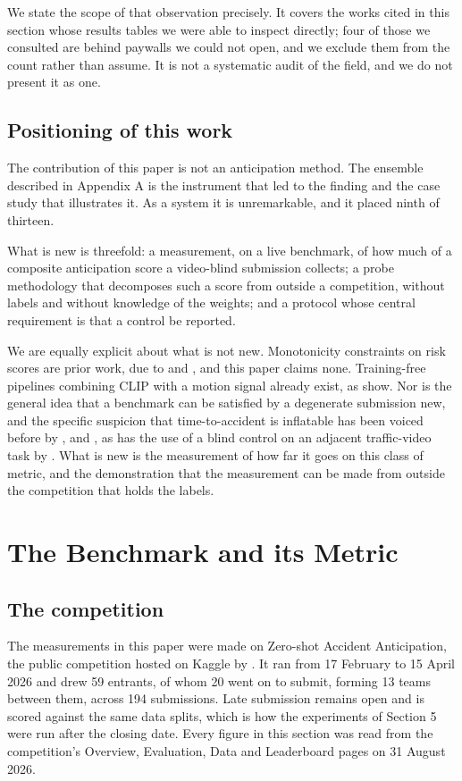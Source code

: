We state the scope of that observation precisely. It covers the works cited in this section whose results tables we were able to inspect directly; four of those we consulted are behind paywalls we could not open, and we exclude them from the count rather than assume. It is not a systematic audit of the field, and we do not present it as one.

\subsection{Positioning of this work}
The contribution of this paper is not an anticipation method. The ensemble described in Appendix A is the instrument that led to the finding and the case study that illustrates it. As a system it is unremarkable, and it placed ninth of thirteen.

What is new is threefold: a measurement, on a live benchmark, of how much of a composite anticipation score a video-blind submission collects; a probe methodology that decomposes such a score from outside a competition, without labels and without knowledge of the weights; and a protocol whose central requirement is that a control be reported.

We are equally explicit about what is not new. Monotonicity constraints on risk scores are prior work, due to \citet{pjetri2025nondecreasing} and \citet{zou2026riskprop}, and this paper claims none. Training-free pipelines combining CLIP with a motion signal already exist, as \citet{thakur2026modular} show. Nor is the general idea that a benchmark can be satisfied by a degenerate submission new, and the specific suspicion that time-to-accident is inflatable has been voiced before by \citet{zhao2025top}, \citet{goldshmidt2025badas} and \citet{caselli2026flara}, as has the use of a blind control on an adjacent traffic-video task by \citet{korkut2026blind}. What is new is the measurement of how far it goes on this class of metric, and the demonstration that the measurement can be made from outside the competition that holds the labels.


\section{The Benchmark and its Metric}

\subsection{The competition}
The measurements in this paper were made on Zero-shot Accident Anticipation, the public competition hosted on Kaggle by \citet{autopilot2026}. It ran from 17 February to 15 April 2026 and drew 59 entrants, of whom 20 went on to submit, forming 13 teams between them, across 194 submissions. Late submission remains open and is scored against the same data splits, which is how the experiments of Section 5 were run after the closing date. Every figure in this section was read from the competition's Overview, Evaluation, Data and Leaderboard pages on 31 August 2026.

